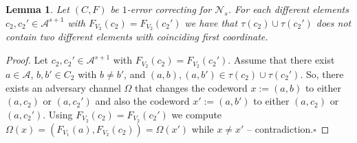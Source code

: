 \documentclass[11pt]{article}
\newcommand{\cA}{\mathcal{A}}
\newcommand{\cN}{\mathcal{N}}
\newtheorem{lemma}[theorem]{Lemma}
\begin{document}


\begin{lemma}
  \label{lemma_disjoint_e_0_components}
  Let $(C,F)$ be $1$-error correcting for $\cN_s$. For each different elements $c_2,c_2'\in \cA^{s+1}$ with $F_{V_2}(c_2)=F_{V_2}(c_2')$ 
  we have that $\tau(c_2)\cup\tau(c_2')$ does not contain two different elements with coinciding first coordinate. 
\end{lemma}
\begin{proof}
  Let $c_2,c_2'\in \cA^{s+1}$ with $F_{V_2}(c_2)=F_{V_2}(c_2')$. Assume that there exist $a\in\cA$, $b,b'\in C_2$ with $b\neq b'$, and $(a,b),(a,b')\in \tau(c_2)\cup\tau(c_2')$.
  So, there exists an adversary channel $\Omega$ that changes the codeword $x:=(a,b)$ to either $(a,c_2)$ or $(a,c_2')$ and also the codeword $x':=(a,b')$ to either $(a,c_2)$ or $(a,c_2')$. 
  Using $F_{V_2}(c_2)=F_{V_2}(c_2')$ we compute $\Omega(x)=\left(F_{V_1}(a),F_{V_2}(c_2)\right)=\Omega(x')$ while $x\neq x'$ -- contradiction.\hfill{$\square$}
\end{proof}
 
\end{document}
